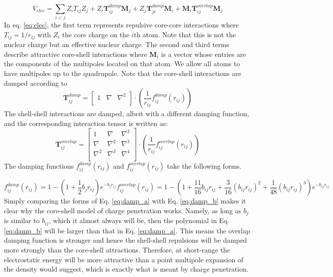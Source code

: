 \documentclass[journal=jacsat,manuscript=article]{achemso}
\begin{document}
\begin{equation}
  V_{elec}=\sum_{i<j}Z_iT_{ij}Z_j+Z_i\bm{T}_{ij}^{damp}\bm{M}_j+Z_j\bm{T}_{ji}^{damp}\bm{M}_i+\bm{M}_i\bm{T}_{ij}^{overlap}\bm{M}_j
  \label{eq:elec}
\end{equation}
\noindent
In eq. \ref{eq:elec}, the first term represents repulsive core-core interactions where $T_{ij}=1/r_{ij}$
with $Z_i$ the core charge on the $i$th atom. Note that this is not the nuclear charge but an effective
nuclear charge. The second and third terms describe attractive core-shell interactions where $\bm{M}_i$ is
a vector whose entries are the components of the multipoles located on that atom. We allow all atoms to have
multipoles up to the quadrupole. Note that the core-shell interactions are damped according to
\begin{equation}
  \bm{T}_{ij}^{damp}=
  \begin{bmatrix}
    1 & \nabla & \nabla^2 \\
  \end{bmatrix}\cdot
  \left(\frac{1}{r_{ij}}f_{ij}^{damp}(r_{ij})\right)
  \label{eq:T_damp}
\end{equation}
\noindent
The shell-shell interactions are damped, albeit with a different damping function,
and the corresponding interaction tensor is written as:
\begin{equation}
  \bm{T}_{ij}^{overlap}=
  \begin{bmatrix}
    1 & \nabla & \nabla^2 \\
    \nabla & \nabla^2 & \nabla^3 \\
    \nabla^2 & \nabla^3 & \nabla^4 \\
  \end{bmatrix}\cdot
  \left(\frac{1}{r_{ij}}f_{ij}^{overlap}(r_{ij})\right)
  \label{eq:T_overlap}
\end{equation}
\noindent
The damping functions $f_{ij}^{damp}(r_{ij})$ and $f_{ij}^{overlap}(r_{ij})$ 
take the following forms.

\begin{subequations}
  \begin{equation}
    f_{ij}^{damp}(r_{ij})=1-\left(1+\frac12b_{j}r_{ij}\right)e^{-b_{j}r_{ij}}
    \label{eq:damp_a}
  \end{equation}
  \begin{equation}
    f_{ij}^{overlap}(r_{ij})=1-\left(1+\frac{11}{16}b_{ij}r_{ij}+\frac{3}{16}(b_{ij}r_{ij})^2+\frac{1}{48}(b_{ij}r_{ij})^3\right)e^{-b_{ij}r_{ij}} 
    \label{eq:damp_b}
  \end{equation}
\end{subequations}
\noindent
Simply comparing the forms of Eq. \ref{eq:damp_a} with Eq. \ref{eq:damp_b} makes it clear
why the core-shell model of charge penetration works. Namely, as long as $b_j$ is similar
to $b_{ij}$, which it almost always will be, then the polynomial in Eq. \ref{eq:damp_b} will
be larger than that in Eq. \ref{eq:damp_a}. This means the overlap damping function is stronger
and hence the shell-shell repulsions will be damped more strongly than the core-shell
attractions. Therefore, at short-range the electrostatic energy will be more attractive than a
point multipole expansion of the density would suggest, which is exactly what is meant by
charge penetration.
\end{document}
